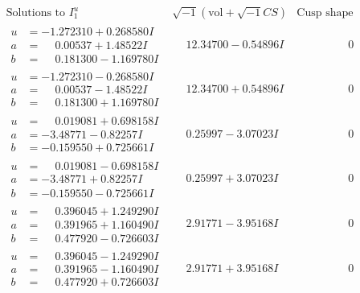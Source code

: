 \documentclass[1p]{elsarticle_modified}
\theoremstyle{definition}
\newcommand{\I}{\sqrt{-1}}
\begin{document}
$$\begin{array}{c|c|c}
\text{Solutions to }I^u_{1}& \I (\text{vol} + \sqrt{-1}CS) & \text{Cusp shape}\\
 \hline 
\begin{aligned}
u &= -1.272310 + 0.268580 I \\
a &= \phantom{-}0.00537 + 1.48522 I \\
b &= \phantom{-}0.181300 - 1.169780 I\end{aligned}
 & \phantom{-}12.34700 - 0.54896 I & \phantom{-0.000000 } 0 \\ \hline\begin{aligned}
u &= -1.272310 - 0.268580 I \\
a &= \phantom{-}0.00537 - 1.48522 I \\
b &= \phantom{-}0.181300 + 1.169780 I\end{aligned}
 & \phantom{-}12.34700 + 0.54896 I & \phantom{-0.000000 } 0 \\ \hline\begin{aligned}
u &= \phantom{-}0.019081 + 0.698158 I \\
a &= -3.48771 - 0.82257 I \\
b &= -0.159550 + 0.725661 I\end{aligned}
 & \phantom{-}0.25997 - 3.07023 I & \phantom{-0.000000 } 0 \\ \hline\begin{aligned}
u &= \phantom{-}0.019081 - 0.698158 I \\
a &= -3.48771 + 0.82257 I \\
b &= -0.159550 - 0.725661 I\end{aligned}
 & \phantom{-}0.25997 + 3.07023 I & \phantom{-0.000000 } 0 \\ \hline\begin{aligned}
u &= \phantom{-}0.396045 + 1.249290 I \\
a &= \phantom{-}0.391965 + 1.160490 I \\
b &= \phantom{-}0.477920 - 0.726603 I\end{aligned}
 & \phantom{-}2.91771 - 3.95168 I & \phantom{-0.000000 } 0 \\ \hline\begin{aligned}
u &= \phantom{-}0.396045 - 1.249290 I \\
a &= \phantom{-}0.391965 - 1.160490 I \\
b &= \phantom{-}0.477920 + 0.726603 I\end{aligned}
 & \phantom{-}2.91771 + 3.95168 I & \phantom{-0.000000 } 0 \\ \hline\begin{aligned}

\end{aligned}
\end{array}$$
\end{document}
